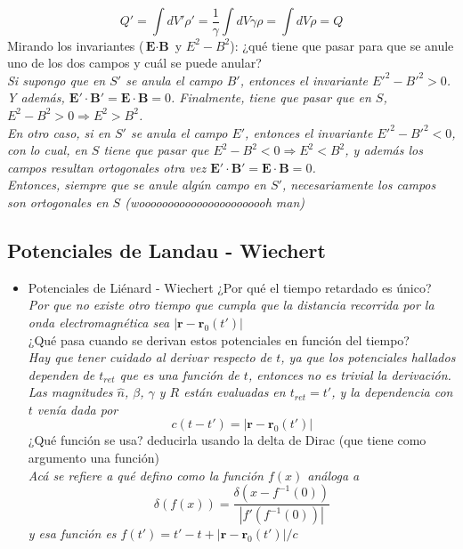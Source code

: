 \begin{itemize}
\begin{equation*}
        Q' 
        = \int dV' \rho' 
        = \frac{1}{\gamma}\int dV \gamma\rho
        = \int dV \rho 
        = Q
    \end{equation*}
    Mirando los invariantes ($\textbf{E}\cdot\textbf{B}$ y $E^{2}-B^{2}$): ¿qué tiene que pasar para que se anule uno de los dos campos y cuál se puede anular?\\
    \textit{Si supongo que en $S'$ se anula el campo $B'$, entonces el invariante $E'^{2} - B'^{2} > 0$. Y además, $\textbf{E}'\cdot \textbf{B}' = \textbf{E}\cdot \textbf{B} = 0$. Finalmente, tiene que pasar que en $S$, $E^{2} - B^{2} > 0 \Longrightarrow E^{2} > B^{2} $.\\
    \indent En otro caso, si en $S'$ se anula el campo $E'$, entonces el invariante $E'^{2} - B'^{2} < 0$, con lo cual, en $S$ tiene que pasar que $E^{2} - B^{2} < 0 \Longrightarrow E^{2} < B^{2}$, y además los campos resultan ortogonales otra vez $\textbf{E}'\cdot \textbf{B}' = \textbf{E}\cdot \textbf{B} = 0$.\\
    \indent Entonces, siempre que se anule algún campo en $S'$, necesariamente los campos son ortogonales en $S$ (wooooooooooooooooooooooh man)}
\end{itemize}


\subsection*{Potenciales de Landau - Wiechert}
\begin{itemize}
    \item Potenciales de Liénard - Wiechert
    ¿Por qué el tiempo retardado es único?\\
    \textit{Por que no existe otro tiempo que cumpla que la distancia recorrida por la onda electromagnética sea $|\textbf{r}-\textbf{r}_{0}(t')|$}\\
    ¿Qué pasa cuando se derivan estos potenciales en función del tiempo?\\
    \textit{Hay que tener cuidado al derivar respecto de $t$, ya que los potenciales hallados dependen de $t_{ret}$ que es una función de $t$, entonces no es trivial la derivación. Las magnitudes $\hat{n}$, $\beta$, $\gamma$ y $R$ están evaluadas en $t_{ret} = t'$, y la dependencia con $t$ venía dada por
    \begin{equation*}
        c(t - t') = |\textbf{r} - \textbf{r}_{0}(t')|
    \end{equation*}
    }
    ¿Qué función se usa? deducirla usando la delta de Dirac (que tiene como argumento una función)\\
    \textit{Acá se refiere a qué defino como la función $f(x)$ análoga a
    \begin{equation*}
    \delta(f(x)) = 
    \frac{\delta(x - f^{-1}(0))}{|f'(f^{-1}(0))|}
    \end{equation*}
    y esa función es $f(t') = t' - t + |\textbf{r}-\textbf{r}_{0}(t')|/c$
    }
\end{itemize}
